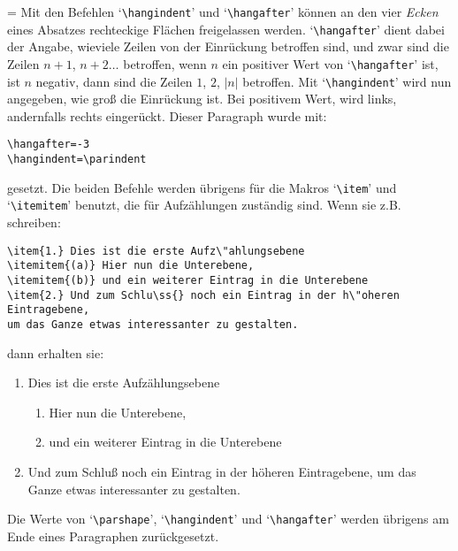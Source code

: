 \hangindent=\parindent
\noindent Mit den Befehlen 
`\verb|\hangindent|' und
`\verb|\hangafter|' k\"onnen an den vier {\em Ecken} eines
Absatzes
rechteckige Fl\"achen freigelassen werden. `\verb|\hangafter|' dient
dabei der Angabe, wieviele Zeilen von der
Einr\"uckung betroffen sind,
und zwar sind die Zeilen $n+1$, $n+2 \ldots$ betroffen, wenn $n$ ein
positiver Wert von `\verb|\hangafter|' ist, ist $n$ negativ, dann sind
die Zeilen $1$, $2$, $|n|$ betroffen. Mit `\verb|\hangindent|' wird
nun angegeben, wie gro\ss{} die Einr\"uckung ist. Bei positivem Wert, wird
links, andernfalls rechts einger\"uckt. Dieser Paragraph wurde mit:
\begin{verbatim}
\hangafter=-3
\hangindent=\parindent
\end{verbatim}
gesetzt.
Die beiden Befehle werden \"ubrigens f\"ur die Makros `\verb|\item|' und
`\verb|\itemitem|' benutzt, die f\"ur 
Aufz\"ahlungen zust\"andig sind. Wenn
sie z.B. schreiben:
\begin{verbatim}
\item{1.} Dies ist die erste Aufz\"ahlungsebene
\itemitem{(a)} Hier nun die Unterebene,
\itemitem{(b)} und ein weiterer Eintrag in die Unterebene
\item{2.} Und zum Schlu\ss{} noch ein Eintrag in der h\"oheren Eintragebene,
um das Ganze etwas interessanter zu gestalten.
\end{verbatim}
dann erhalten sie:

\begin{enumerate}
\item Dies ist die erste Aufz\"ahlungsebene
\begin{enumerate}
\item Hier nun die Unterebene,
\item und ein weiterer Eintrag in die Unterebene
\end{enumerate}
\item Und zum Schlu\ss{} noch ein Eintrag in der h\"oheren Eintragebene,
um das Ganze etwas interessanter zu gestalten.
\end{enumerate}

Die Werte von 
`\verb|\parshape|', 
`\verb|\hangindent|' und
`\verb|\hangafter|' werden \"ubrigens am Ende eines Paragraphen
zur\"uckgesetzt.
